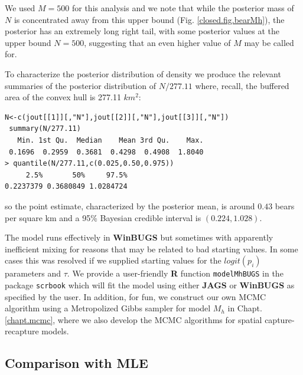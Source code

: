 We used $M=500$ for this analysis and we
note that  while the posterior mass of $N$ is concentrated away from this
upper bound (Fig. \ref{closed.fig.bearMh}), the posterior has an
extremely long right tail, with some posterior values at the upper
bound $N=500$, suggesting that an even higher value of $M$ may be
called for.

To characterize the posterior distribution of density we produce the
relevant summaries of the posterior distribution of $N/277.11$ where,
recall, the buffered area of the convex hull is 277.11 $km^2$:
{\small
\begin{verbatim}
N<-c(jout[[1]][,"N"],jout[[2]][,"N"],jout[[3]][,"N"])
 summary(N/277.11)
   Min. 1st Qu.  Median    Mean 3rd Qu.    Max.
 0.1696  0.2959  0.3681  0.4298  0.4908  1.8040
> quantile(N/277.11,c(0.025,0.50,0.975))
     2.5%       50%     97.5%
0.2237379 0.3680849 1.0284724
\end{verbatim}
}
so the point estimate, characterized by the posterior mean, is around
$0.43$ bears per square km and a 95\% Bayesian credible interval is
$(0.224, 1.028)$.


The model runs effectively in {\bf WinBUGS} but sometimes with apparently
inefficient mixing for reasons that may be related to bad starting
values. In some cases this was resolved if we supplied starting values
for the $logit(p_{i})$ parameters and $\tau$. We provide a user-friendly {\bf R}
function \mbox{\tt modelMhBUGS} in the package \mbox{\tt scrbook} which will
fit the model using either {\bf JAGS} or {\bf WinBUGS} as specified by
the user.
In addition, for fun, we construct our own MCMC algorithm using a Metropolized
Gibbs sampler for model $M_{h}$ in Chapt. \ref{chapt.mcmc}, where we
also develop the MCMC  algorithms for spatial capture-recapture models.


\subsection{Comparison with MLE}

